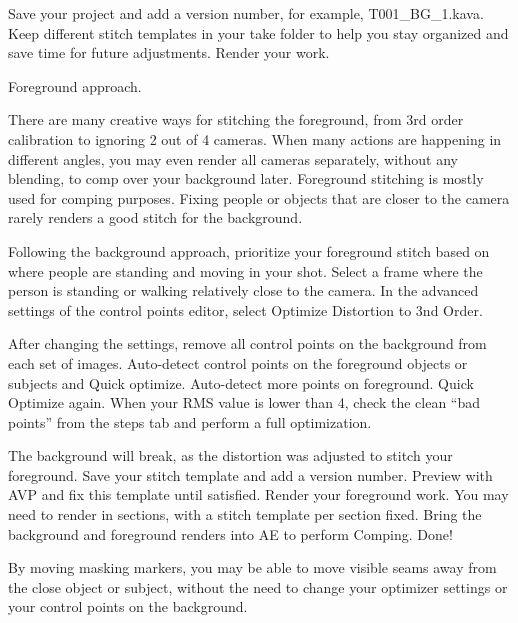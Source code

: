 \begin{fullwidth}
Save your project and add a version number, for example, T001\_BG\_1.kava. Keep different stitch templates in your take folder to help you stay organized and save time for future adjustments. Render your work.


{\large Foreground approach. \par}

There are many creative ways for stitching the foreground, from 3rd order calibration to ignoring 2 out of 4 cameras. When many actions are happening in different angles, you may even render all cameras separately, without any blending, to comp over your background later. Foreground stitching is mostly used for comping purposes. Fixing people or objects that are closer to the camera rarely renders a good stitch for the background.

\clearpage

Following the background approach, prioritize your foreground stitch based on where people are standing and moving in your shot. Select a frame where the person is standing or walking relatively close to the camera. In the advanced settings of the control points editor, select Optimize Distortion to 3nd Order.


After changing the settings, remove all control points on the background from each set of images. Auto-detect control points on the foreground objects or subjects and Quick optimize. Auto-detect more points on foreground. Quick Optimize again. When your RMS value is lower than 4, check the clean “bad points” from the steps tab and perform a full optimization.


\clearpage

The background will break, as the distortion was adjusted to stitch your foreground. Save your stitch template and add a version number. Preview with AVP and fix this template until satisfied. Render your foreground work. You may need to render in sections, with a stitch template per section fixed. Bring the background and foreground renders into AE to perform Comping. Done!


\tip By moving masking markers, you may be able to move visible seams away from the close object or subject, without the need to change your optimizer settings or your control points on the background.


\clearpage
\end{fullwidth}